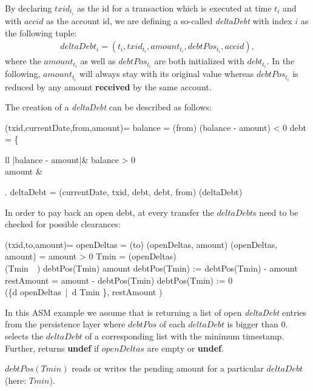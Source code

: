 By declaring $txid_{t_i}$ as the id for a transaction which is executed at time $t_i$ and with $accid$ as the account id, we are defining a so-called \textit{deltaDebt} with index $i$ as the following tuple:
\begin{align}
	deltaDebt_i = (t_i, txid_{t_i}, amount_{t_i}, debtPos_{t_i}, accid),
\end{align}
where the $amount_{t_i}$ as well as $debtPos_{t_i}$ are both initialized with $debt_{t_i}$. In the following, $amount_{t_i}$ will always stay with its original value whereas $debtPos_{t_i}$ is reduced by any amount \textbf{received} by the same account.

The creation of a \textit{deltaDebt} can be described as follows:

\begin{asm}
	(txid,currentDate,from,amount)=\+
		\LET balance = (from)\+
			\IF (balance - amount) < 0 \THEN\+
				\LET debt =  \+\left\{\begin{array}{ll}
						|balance - amount|\+& \IF balance > 0\\
						amount & \ELSE
					\end{array}\right.\-\-
				\LET deltaDebt = (currentDate, txid, debt, debt, from)\+
					(deltaDebt)
\end{asm}

In order to pay back an open debt, at every transfer the $deltaDebt$s need to be checked for possible clearances:

\begin{asm}
	(txid,to,amount)=\+
		\LET openDeltas = (to)\+
			(openDeltas, amount)\dec\-
	\WHERE \+
		(openDeltas, amount) =\+
		\IF amount > 0 \THEN\+
			\LET Tmin = (openDeltas)\\
			\IF (Tmin\ \neq\ \UNDEF) \THEN\+
				\IF debtPos(Tmin) \ge amount \THEN\+
					debtPos(Tmin) := debtPos(Tmin) - amount\-
				\ELSE\+
					\LET restAmount = amount - debtPos(Tmin)\+
						debtPos(Tmin) := 0\\
						(\{d \in openDeltas\ |\ d \neq Tmin \}, restAmount )\dec\dec\dec\-
\end{asm}


In this ASM example we assume that  is returning a list of open \textit{deltaDebt} entries from the persistence layer where $debtPos$ of each $deltaDebt$ is bigger than $0$.  selects the $deltaDebt$ of a corresponding list with the minimum timestamp. Further,  returns \textbf{undef} if $openDeltas$ are empty or \textbf{undef}.

$debtPos(Tmin)$ reads or writes the pending amount for a particular $deltaDebt$ (here: $Tmin$).









